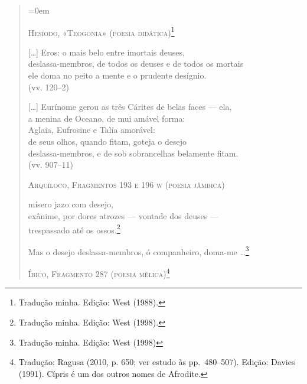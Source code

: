 \begin{quote} \parindent=0em
{\centering
\textsc{Hesíodo, «Teogonia» (poesia didática)\footnote{Tradução minha. Edição: West (1988).}}
\par}

\smallskip

	[\ldots{}] Eros: o mais belo entre imortais deuses,\\
	deslassa-membros, de todos os deuses e de todos os mortais\\
	ele doma no peito a mente e o prudente desígnio.\\
	\mbox{}\hfill (vv. 120--2)

\smallskip

	\hspace*{2em}[\ldots{}] Eurínome gerou as três Cárites de belas faces --- ela,\\
	\hspace*{4.5em}a menina de Oceano, de mui amável forma:\\
	\hspace*{4.5em}Aglaia, Eufrosine e Talía amorável:\\
	\hspace*{4.5em}de seus olhos, quando fitam, goteja o desejo\\
	\hspace*{4.5em}deslassa-membros, e de sob sobrancelhas belamente fitam.\\
	\mbox{}\hfill (vv. 907--11)

\bigskip

{\centering
\textsc{Arquíloco, Fragmentos 193 e 196 \textsc{w} (poesia jâmbica)}
\par}

\smallskip

	\hspace*{4.5em}mísero jazo com desejo,\\
	\hspace*{2em}exânime, por dores atrozes --- vontade dos deuses ---\\
	\hspace*{4.5em}trespassado até os ossos.\footnote{ Tradução minha. Edição: West (1998).}

\smallskip

	Mas o desejo deslassa-membros, ó companheiro, doma-me
	\ldots{}\footnote{ Tradução minha. Edição: West (1998)}

\bigskip

{\centering
\textsc{Íbico, Fragmento 287 (poesia mélica)\footnote{ Tradução: Ragusa (2010, p.
650; ver estudo às pp.~480--507). Edição: Davies (1991). Cípris é um dos outros nomes de Afrodite.}}
\par}


\end{quote}
